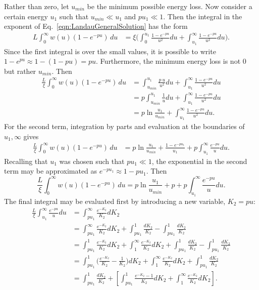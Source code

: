Rather than zero, let $u_{min}$ be the minimum possible energy loss. Now consider a certain energy $u_1$ such that $u_{min}\ll u_1$ and $pu_1 \ll 1$. Then the integral in the exponent of Eq.~\eqref{eqn:LandauGeneralSolution} has the form
\begin{align*}
L\int_0 ^\infty w(u)  (1-e^{-pu})\, du &= \xi\Big( \int_0 ^{u_1} \frac{1-e^{-pu}}{u^2} du + \int_{u_1} ^\infty \frac{1-e^{-pu}}{u^2} du\Big) .
\end{align*}
Since the first integral is over the small values, it is possible to write $1-e^{pu} \approx 1-(1-pu) = pu$. Furthermore, the minimum energy loss is not 0 but rather $u_{min}$. Then
\begin{align*}
\frac{L}{\xi}\int_0 ^\infty w(u)  (1-e^{-pu})\, du &=\int_{u_{min}} ^{u_1} \frac{p\ u}{u^2} du + \int_{u_1} ^\infty \frac{1-e^{-pu}}{u^2} du\\
&=p\int_{u_{min}} ^{u_1} \frac{1}{u} du + \int_{u_1} ^\infty \frac{1-e^{-pu}}{u^2} du\\
&=p \ln\frac{u_1}{u_{min}} + \int_{u_1} ^\infty \frac{1-e^{-pu}}{u^2} du.
\end{align*}
For the second term, integration by parts and evaluation at the boundaries of $u_1, \infty$ gives
\begin{align*}
\frac{L}{\xi}\int_0 ^\infty w(u)  (1-e^{-pu})\, du &=p \ln\frac{u_1}{u_{min}} + \frac{1-e^{-pu_1}}{u_1}+p\int_{u_1}^\infty \frac{e^{-pu}}{u} du.
\end{align*}
Recalling that $u_1$ was chosen such that $pu_1 \ll 1$, the exponential in the second term may be approximated as $e^{-pu_1}\approx 1-pu_1$. Then
\begin{equation} \label{eqn:landauIntermediate1}
\frac{L}{\xi}\int_0 ^\infty w(u)  (1-e^{-pu})\, du =p \ln\frac{u_1}{u_{min}} + p+p\int_{u_1}^\infty \frac{e^{-pu}}{u} du.
\end{equation}
The final integral may be evaluated first by introducing a new variable, $K_2=pu$:
\begin{align*}
\frac{L}{\xi}\int_{u_1}^\infty \frac{e^{-pu}}{u} du &= \int _{pu_1} ^\infty \frac{e^{-K_2}}{K_2}dK_2\\
&= \int_{pu_1} ^\infty \frac{e^{-K_2}}{K_2} dK_2 + \int_{pu_1} ^1 \frac{dK_2}{K_2} - \int_{pu_1} ^1 \frac{dK_2}{K_2} \\
&= \int_{pu_1} ^1 \frac{e^{-K_2}}{K_2} dK_2 + \int_1 ^\infty \frac{e^{-K_2}}{K_2} dK_2 + \int_{pu_1} ^1 \frac{dK_2}{K_2} - \int_{pu_1} ^1 \frac{dK_2}{K_2} \\
&= \int_{pu_1} ^1 \Big(\frac{e^{-K_2}}{K_2}-\frac{1}{K_2}\Big) dK_2 + \int_1 ^\infty \frac{e^{-K_2}}{K_2} dK_2 + \int_{pu_1} ^1 \frac{dK_2}{K_2} \\
&= \int_{pu_1} ^1 \frac{dK_2}{K_2} + \left[\int_{pu_1} ^1 \frac{e^{-K_2}-1}{K_2} dK_2 + \int_1 ^\infty \frac{e^{-K_2}}{K_2} dK_2 \right].
\end{align*}
